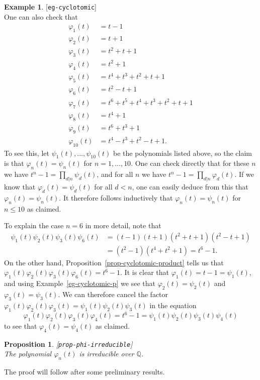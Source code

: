\documentclass{amsart}
\newcommand{\lbl}[1]{\label{#1}\textup{[\texttt{#1}]}\ \\}
\newcommand{\lbl}{\label}
\newcommand{\Q}         {{\mathbb{Q}}}
\newcommand{\vph}       {\varphi}
\renewcommand{\:}{\colon}
\newtheorem{proposition}[theorem]{Proposition}
\theoremstyle{definition}
\newtheorem{example}[theorem]{Example}
\begin{document}
\begin{example}\lbl{eg-cyclotomic}
 One can also check that 
 \begin{align*}
  \vph_1(t) &= t-1 \\
  \vph_2(t) &= t+1 \\
  \vph_3(t) &= t^2+t+1 \\
  \vph_4(t) &= t^2+1 \\
  \vph_5(t) &= t^4+t^3+t^2+t+1 \\
  \vph_6(t) &= t^2-t+1 \\
  \vph_7(t) &= t^6+t^5+t^4+t^3+t^2+t+1 \\
  \vph_8(t) &= t^4+1 \\
  \vph_9(t) &= t^6+t^3+1 \\
  \vph_{10}(t) &= t^4-t^3+t^2-t+1.
 \end{align*}
 To see this, let $\psi_1(t),\dotsc,\psi_{10}(t)$ be the polynomials
 listed above, so the claim is that $\vph_n(t)=\psi_n(t)$ for
 $n=1,\dotsc,10$.  One can check directly that for these $n$ we have
 $t^n-1=\prod_{d|n}\psi_d(t)$, and for all $n$ we have
 $t^n-1=\prod_{d|n}\vph_d(t)$.  If we know that $\vph_d(t)=\psi_d(t)$
 for all $d<n$, one can easily deduce from this that
 $\vph_n(t)=\psi_n(t)$.  It therefore follows inductively that
 $\vph_n(t)=\psi_n(t)$ for $n\leq 10$ as claimed. 

 To explain the case $n=6$ in more detail, note that 
 \begin{align*}
  \psi_1(t)\psi_2(t)\psi_3(t)\psi_6(t) 
   &= (t-1)(t+1)(t^2+t+1)(t^2-t+1) \\
   &= (t^2-1)(t^4+t^2+1) = t^6-1.
 \end{align*}
 On the other hand, Proposition~\ref{prop-cyclotomic-product} tells
 us that $\vph_1(t)\vph_2(t)\vph_3(t)\vph_6(t)=t^6-1$.  It is clear
 that $\vph_1(t)=t-1=\psi_1(t)$, and using
 Example~\ref{eg-cyclotomic-p} we see that $\vph_2(t)=\psi_2(t)$ and
 $\vph_3(t)=\psi_3(t)$.  We can therefore cancel the factor
 $\vph_1(t)\vph_2(t)\vph_3(t)=\psi_1(t)\psi_2(t)\psi_3(t)$ in the
 equation
 \[ \vph_1(t)\vph_2(t)\vph_3(t)\vph_4(t) =
     t^6-1 = 
    \psi_1(t)\psi_2(t)\psi_3(t)\psi_4(t)
 \]
 to see that $\vph_4(t)=\psi_4(t)$ as claimed.
\end{example}

\begin{proposition}\lbl{prop-phi-irreducible}
 The polynomial $\vph_n(t)$ is irreducible over $\Q$.
\end{proposition}
The proof will follow after some preliminary results.
\end{document}
